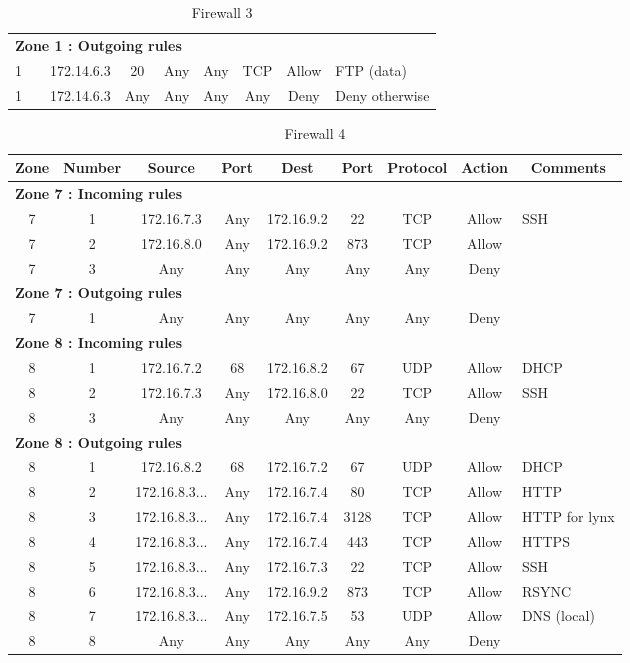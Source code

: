 \documentclass[a4paper,titlepage]{article}
\begin{document}
\begin{table}[h]
\begin{tabular}{c|c|cc|cc|ccl}
		\hline
		\multicolumn{9}{l}{\textbf{Zone 1 : Outgoing rules}}\\
		1 &  & 172.14.6.3 & 20 & Any & Any & TCP & Allow & FTP (data)\\
		1 &  & 172.14.6.3 & Any & Any & Any & Any & Deny & Deny otherwise\\
	\end{tabular}
	\caption{Firewall 3}
\end{table}





\begin{table}[h]
	\center
	\begin{tabular}{c|c|cc|cc|ccl}
		Zone & Number & Source & Port & Dest & Port & Protocol & Action & \multicolumn{1}{c}{Comments}\\
		\hline
		\multicolumn{9}{l}{\textbf{Zone 7 : Incoming rules}}\\
		7 & 1 & 172.16.7.3 & Any & 172.16.9.2 & 22 & TCP & Allow & SSH\\
		7 & 2 & 172.16.8.0 & Any & 172.16.9.2 & 873 & TCP & Allow & \\
		7 & 3 & Any & Any & Any & Any & Any & Deny & \\
		\hline
		\multicolumn{9}{l}{\textbf{Zone 7 : Outgoing rules}}\\
		7 & 1 & Any & Any & Any & Any & Any & Deny & \\

		\hline
		\multicolumn{9}{l}{\textbf{Zone 8 : Incoming rules}}\\
		8 & 1 & 172.16.7.2 & 68 &  172.16.8.2 & 67 & UDP & Allow & DHCP\\
		8 & 2 & 172.16.7.3 & Any & 172.16.8.0 & 22 & TCP & Allow & SSH \\
		8 & 3 & Any & Any & Any & Any & Any & Deny & \\
		\hline
		\multicolumn{9}{l}{\textbf{Zone 8 : Outgoing rules}}\\
		8 & 1 & 172.16.8.2 & 68 & 172.16.7.2 & 67 & UDP & Allow & DHCP\\
		8 & 2 & 172.16.8.3... & Any & 172.16.7.4 & 80 & TCP & Allow & HTTP \\
		8 & 3 & 172.16.8.3... & Any & 172.16.7.4 & 3128 & TCP & Allow & HTTP for lynx\\
		8 & 4 & 172.16.8.3... & Any & 172.16.7.4 & 443 & TCP & Allow & HTTPS \\
		8 & 5 & 172.16.8.3... & Any & 172.16.7.3 & 22 & TCP & Allow & SSH \\
		8 & 6 & 172.16.8.3... & Any & 172.16.9.2 & 873 & TCP & Allow & RSYNC \\
		8 & 7 & 172.16.8.3... & Any & 172.16.7.5 & 53 & UDP & Allow & DNS (local) \\
		8 & 8 & Any & Any & Any & Any & Any & Deny & \\
		\hline

	\end{tabular}
	\caption{Firewall 4}
\end{table}
\end{document}
